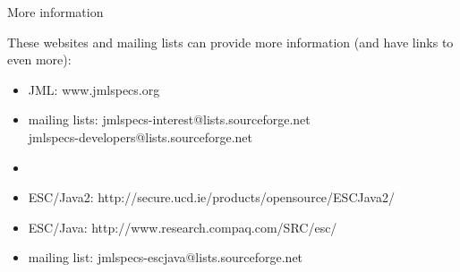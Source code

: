 \documentclass[
pdf,
nocolorBG,
slideColor,
erik,
]{prosper}
\begin{document}
\begin{slide}{More information}

\vspace*{-4ex}
These websites and mailing lists can provide more information (and have links to even more):

\begin{itemize}

\item JML: www.jmlspecs.org
\item mailing lists:  jmlspecs-interest@lists.sourceforge.net\\
jmlspecs-developers@lists.sourceforge.net 

\item[]
\item ESC/Java2:  http://secure.ucd.ie/products/opensource/ESCJava2/
\item ESC/Java:    http://www.research.compaq.com/SRC/esc/
\item mailing list:  jmlspecs-escjava@lists.sourceforge.net

\end{itemize}
  
\end{slide}
\end{document}
